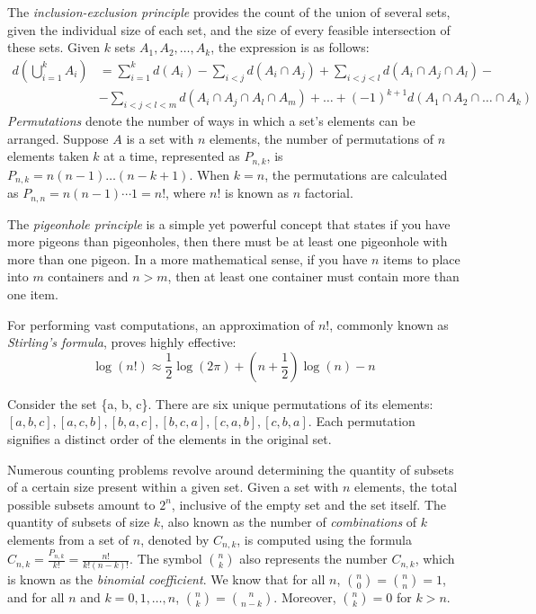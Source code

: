 The \emph{inclusion-exclusion principle} provides the count of the union of several sets, given the individual size of each set, and the size of every feasible intersection of these sets. Given $k$ sets $A_1, A_2, \ldots, A_k$, the expression is as follows:
\begin{equation*}
\begin{split}
d \left( \bigcup_{i=1}^k A_i \right) & = \sum_{i=1}^k d \left( A_i \right) - \sum_{i<j} d \left( A_i \cap A_j \right) + \sum_{i<j<l} d \left( A_i \cap A_j \cap A_l \right) - \\
& - \sum_{i<j<l<m} d \left( A_i \cap A_j \cap A_l \cap A_m \right) + \ldots +  (-1)^{k+1} d \left( A_1 \cap A_2 \cap \ldots \cap A_k \right) 
\end{split}
\end{equation*}
\emph{Permutations} denote the number of ways in which a set's elements can be arranged. Suppose $A$ is a set with $n$ elements, the number of permutations of $n$ elements taken $k$ at a time, represented as $P_{n,k}$, is $P_{n,k} = n \left( n-1 \right) \ldots \left( n-k+1 \right)$. When $k=n$, the permutations are calculated as $P_{n,n} = n \left( n-1 \right) \cdots 1=n!$, where $n!$ is known as $n$ factorial.

The \emph{pigeonhole principle} is a simple yet powerful concept that states if you have more pigeons than pigeonholes, then there must be at least one pigeonhole with more than one pigeon. In a more mathematical sense, if you have $n$ items to place into $m$ containers and $n>m$, then at least one container must contain more than one item.

For performing vast computations, an approximation of $n!$, commonly known as \emph{Stirling's formula}, proves highly effective:
\[
\log\left(n!\right) \approx \frac{1}{2}\log\left(2\pi\right)+\left(n+\frac{1}{2}\right)\log\left(n\right)-n
\]

\begin{example}
Consider the set \{a, b, c\}. There are six unique permutations of its elements: $[a, b, c], [a, c, b], [b, a, c], [b, c, a], [c, a, b], [c, b, a]$. Each permutation signifies a distinct order of the elements in the original set.
\end{example}

Numerous counting problems revolve around determining the quantity of subsets of a certain size present within a given set. Given a set with $n$ elements, the total possible subsets amount to $2^n$, inclusive of the empty set and the set itself. The quantity of subsets of size $k$, also known as the number of \emph{combinations} of $k$ elements from a set of $n$, denoted by $C_{n,k}$, is computed using the formula $C_{n,k}=\frac{P_{n,k}}{k!}=\frac{n!}{k!\left(n-k\right)!}$. The symbol ${n \choose k}$ also represents the number $C_{n,k}$, which is known as the \emph{binomial coefficient}. We know that for all $n$, ${n \choose 0}={n \choose n}=1$, and for all $n$ and $k=0,1,\ldots,n$, ${n \choose k}={n \choose n-k}$. Moreover, ${n \choose k} = 0$ for $k>n$.

